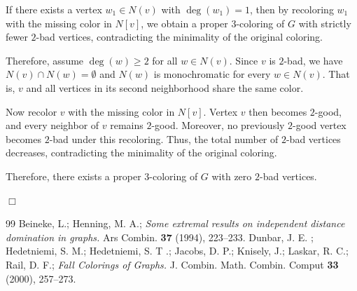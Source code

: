 \documentclass[10pt,a4paper]{amsart}
\numberwithin{equation}{theorem}
\begin{document}
If there exists a vertex $w_1 \in N(v)$ with $\deg(w_1)=1$, 
then by recoloring $w_1$ with the missing color in $N[v]$, 
we obtain a proper $3$-coloring of $G$ with strictly fewer $2$-bad vertices, 
contradicting the minimality of the original coloring.

Therefore, assume $\deg(w) \geq 2$ for all $w \in N(v)$. 
Since $v$ is $2$-bad, we have $N(v) \cap N(w) = \emptyset$ and $N(w)$ is monochromatic for every $w \in N(v)$. 
That is, $v$ and all vertices in its second neighborhood share the same color.

Now recolor $v$ with the missing color in $N[v]$. 
Vertex $v$ then becomes $2$-good, and every neighbor of $v$ remains $2$-good. 
Moreover, no previously $2$-good vertex becomes $2$-bad under this recoloring. 
Thus, the total number of $2$-bad vertices decreases, 
contradicting the minimality of the original coloring.

Therefore, there exists a proper $3$-coloring of $G$ with zero $2$-bad vertices.

\hfill$\Box$\\

\begin{thebibliography}{99}
 Beineke, L.; Henning, M. A.; \textit{Some extremal results on independent distance domination in graphs.} Ars Combin. {\bf 37} (1994), 223--233.
 Dunbar, J. E. ; Hedetniemi, S. M.; Hedetniemi, S. T .; Jacobs, D. P.; Knisely, J.; Laskar, R. C.; Rail, D. F.; \textit{Fall Colorings of Graphs.} J. Combin. Math. Combin. Comput {\bf 33} (2000), 257--273.
\end{thebibliography}
\end{document}
